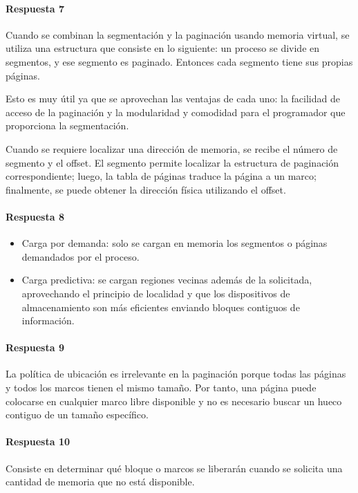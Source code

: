 \paragraph{Respuesta 7}
Cuando se combinan la segmentación y la paginación usando memoria virtual, se utiliza una estructura que consiste en lo siguiente: un proceso se divide en segmentos, y ese segmento es paginado. Entonces cada segmento tiene sus propias páginas.

Esto es muy útil ya que se aprovechan las ventajas de cada uno: la facilidad de acceso de la paginación y la modularidad y comodidad para el programador que proporciona la segmentación.

Cuando se requiere localizar una dirección de memoria, se recibe el número de segmento y el offset. El segmento permite localizar la estructura de paginación correspondiente; luego, la tabla de páginas traduce la página a un marco; finalmente, se puede obtener la dirección física utilizando el offset.

\paragraph{Respuesta 8}
\begin{itemize}
  \item Carga por demanda: solo se cargan en memoria los segmentos o páginas demandados por el proceso.
  \item Carga predictiva: se cargan regiones vecinas además de la solicitada, aprovechando el principio de localidad y que los dispositivos de almacenamiento son más eficientes enviando bloques contiguos de información.
\end{itemize}

\paragraph{Respuesta 9}
La política de ubicación es irrelevante en la paginación porque todas las páginas y todos los marcos tienen el mismo tamaño. Por tanto, una página puede colocarse en cualquier marco libre disponible y no es necesario buscar un hueco contiguo de un tamaño específico.

\paragraph{Respuesta 10}
Consiste en determinar qué bloque o marcos se liberarán cuando se solicita una cantidad de memoria que no está disponible. 

